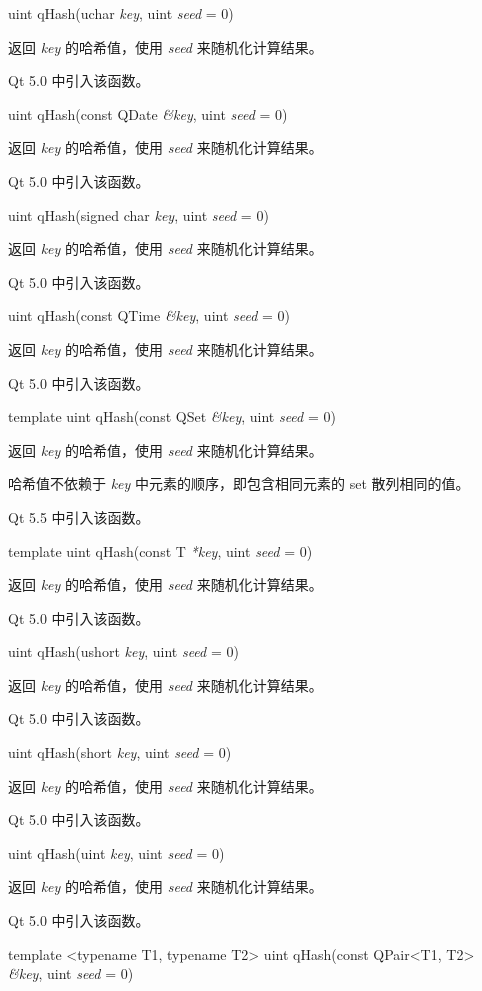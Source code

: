 uint qHash(uchar \emph{key}, uint \emph{seed} = 0)

返回 \emph{key} 的哈希值，使用 \emph{seed} 来随机化计算结果。

Qt 5.0 中引入该函数。

uint qHash(const QDate \emph{\&key}, uint \emph{seed} = 0)

返回 \emph{key} 的哈希值，使用 \emph{seed} 来随机化计算结果。

Qt 5.0 中引入该函数。

uint qHash(signed char \emph{key}, uint \emph{seed} = 0)

返回 \emph{key} 的哈希值，使用 \emph{seed} 来随机化计算结果。

Qt 5.0 中引入该函数。

uint qHash(const QTime \emph{\&key}, uint \emph{seed} = 0)

返回 \emph{key} 的哈希值，使用 \emph{seed} 来随机化计算结果。

Qt 5.0 中引入该函数。

template uint qHash(const QSet \emph{\&key}, uint \emph{seed} = 0)

返回 \emph{key} 的哈希值，使用 \emph{seed} 来随机化计算结果。

哈希值不依赖于 \emph{key} 中元素的顺序，即包含相同元素的 set 散列相同的值。

Qt 5.5 中引入该函数。

template uint qHash(const T \emph{*key}, uint \emph{seed} = 0)

返回 \emph{key} 的哈希值，使用 \emph{seed} 来随机化计算结果。

Qt 5.0 中引入该函数。

uint qHash(ushort \emph{key}, uint \emph{seed} = 0)

返回 \emph{key} 的哈希值，使用 \emph{seed} 来随机化计算结果。

Qt 5.0 中引入该函数。

uint qHash(short \emph{key}, uint \emph{seed} = 0)

返回 \emph{key} 的哈希值，使用 \emph{seed} 来随机化计算结果。

Qt 5.0 中引入该函数。

uint qHash(uint \emph{key}, uint \emph{seed} = 0)

返回 \emph{key} 的哈希值，使用 \emph{seed} 来随机化计算结果。

Qt 5.0 中引入该函数。

template <typename T1, typename T2> uint qHash(const QPair<T1, T2> \emph{\&key}, uint \emph{seed} = 0)

